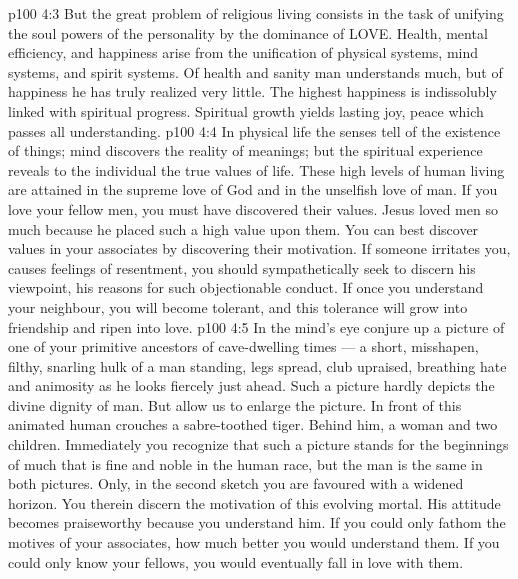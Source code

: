 \vs p100 4:3 But the great problem of religious living consists in the task of unifying the soul powers of the personality by the dominance of LOVE. Health, mental efficiency, and happiness arise from the unification of physical systems, mind systems, and spirit systems. Of health and sanity man understands much, but of happiness he has truly realized very little. The highest happiness is indissolubly linked with spiritual progress. Spiritual growth yields lasting joy, peace which passes all understanding.
\vs p100 4:4 \pc In physical life the senses tell of the existence of things; mind discovers the reality of meanings; but the spiritual experience reveals to the individual the true values of life. These high levels of human living are attained in the supreme love of God and in the unselfish love of man. If you love your fellow men, you must have discovered their values. Jesus loved men so much because he placed such a high value upon them. You can best discover values in your associates by discovering their motivation. If someone irritates you, causes feelings of resentment, you should sympathetically seek to discern his viewpoint, his reasons for such objectionable conduct. If once you understand your neighbour, you will become tolerant, and this tolerance will grow into friendship and ripen into love.
\vs p100 4:5 In the mind’s eye conjure up a picture of one of your primitive ancestors of cave\hyp{}dwelling times --- a short, misshapen, filthy, snarling hulk of a man standing, legs spread, club upraised, breathing hate and animosity as he looks fiercely just ahead. Such a picture hardly depicts the divine dignity of man. But allow us to enlarge the picture. In front of this animated human crouches a sabre\hyp{}toothed tiger. Behind him, a woman and two children. Immediately you recognize that such a picture stands for the beginnings of much that is fine and noble in the human race, but the man is the same in both pictures. Only, in the second sketch you are favoured with a widened horizon. You therein discern the motivation of this evolving mortal. His attitude becomes praiseworthy because you understand him. If you could only fathom the motives of your associates, how much better you would understand them. If you could only know your fellows, you would eventually fall in love with them.
